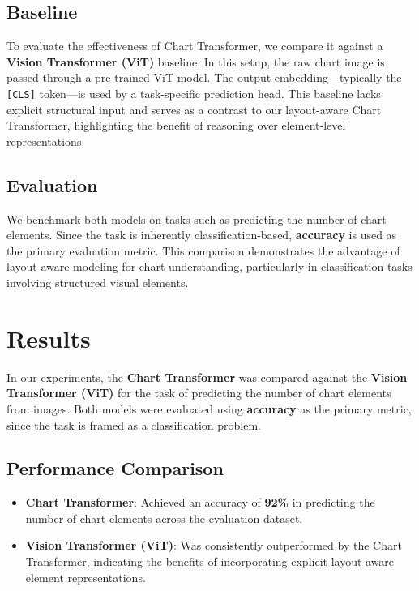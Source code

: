 \documentclass[11pt]{article}
\begin{document}
\subsection*{Baseline}

To evaluate the effectiveness of Chart Transformer, we compare it against a \textbf{Vision Transformer (ViT)} baseline. In this setup, the raw chart image is passed through a pre-trained ViT model. The output embedding—typically the \texttt{[CLS]} token—is used by a task-specific prediction head. This baseline lacks explicit structural input and serves as a contrast to our layout-aware Chart Transformer, highlighting the benefit of reasoning over element-level representations.

\subsection*{Evaluation}

We benchmark both models on tasks such as predicting the number of chart elements. Since the task is inherently classification-based, \textbf{accuracy} is used as the primary evaluation metric. This comparison demonstrates the advantage of layout-aware modeling for chart understanding, particularly in classification tasks involving structured visual elements.


\section{Results}

In our experiments, the \textbf{Chart Transformer} was compared against the \textbf{Vision Transformer (ViT)} for the task of predicting the number of chart elements from images. Both models were evaluated using \textbf{accuracy} as the primary metric, since the task is framed as a classification problem.

\subsection*{Performance Comparison}

\begin{itemize}
    \item \textbf{Chart Transformer}: Achieved an accuracy of \textbf{92\%} in predicting the number of chart elements across the evaluation dataset.
    \item \textbf{Vision Transformer (ViT)}: Was consistently outperformed by the Chart Transformer, indicating the benefits of incorporating explicit layout-aware element representations.
\end{itemize}
\end{document}
